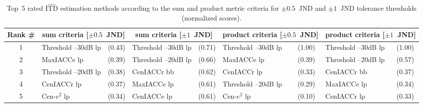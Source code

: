 \documentclass[reprint]{JASAnew}
\begin{document}
\begin{table}[h]
\caption{Top~5 rated $\widehat{\textrm{ITD}}$ estimation methods
according to the sum and product metric criteria for $\pm0.5$~JND and
$\pm1$~JND tolerance thresholds (normalized scores).}

\begin{adjustbox}{width=\textwidth}
\begin{tabular}{c| l l| l l| l l| l l}
\hline\hline
Rank \#& \multicolumn{2}{c}{sum criteria [$\pm0.5$~JND]} &
\multicolumn{2}{|c}{sum criteria [$\pm1$~JND]} &
\multicolumn{2}{|c}{product criteria [$\pm0.5$~JND]} & \multicolumn{2}{|c}{product criteria [$\pm1$~JND]}\\ 
\hline
1 & Threshold --30dB {lp} & (0.43) & Threshold --30dB {lp} & (0.71) & Threshold --30dB {lp} & (1.00) & Threshold --30dB {lp} & (1.00) \\ 
2 & MaxIACCe {lp} & (0.39) & Threshold --20dB {lp} & (0.66) & MaxIACCe {lp} & (0.39) & Threshold --20dB {lp} & (0.57) \\ 
3 & Threshold --20dB {lp} & (0.38) & CenIACCr {bb} &(0.62) & CenIACCr {lp} &(0.33) & CenIACCr {bb} & (0.37) \\ 
4 & CenIACCr {lp} &(0.37) & MaxIACCe {lp} & (0.61) & Threshold --20dB {lp} & (0.29) & MaxIACCe {lp} & (0.34) \\ 
5 & Cen-$e^2$ {lp} &(0.34) & CenIACCe {lp} & (0.61) & Cen-$e^2$ {lp}
& (0.10) & CenIACCr {lp} & (0.33) \\
\hline\hline
\end{tabular}
\end{adjustbox}

\label{tab:topMethods} 
\end{table}
\twocolumngrid

\newpage
\end{document}
